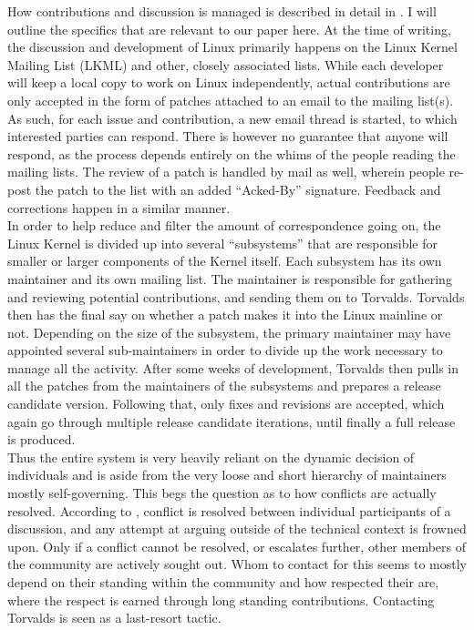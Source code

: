 How contributions and discussion is managed is described in detail in \cite{linux-participation}. I will outline the specifics that are relevant to our paper here. At the time of writing, the discussion and development of Linux primarily happens on the Linux Kernel Mailing List (LKML) and other, closely associated lists. While each developer will keep a local copy to work on Linux independently, actual contributions are only accepted in the form of patches attached to an email to the mailing list(s). As such, for each issue and contribution, a new email thread is started, to which interested parties can respond. There is however no guarantee that anyone will respond, as the process depends entirely on the whims of the people reading the mailing lists. The review of a patch is handled by mail as well, wherein people re-post the patch to the list with an added ``Acked-By'' signature. Feedback and corrections happen in a similar manner. \\

In order to help reduce and filter the amount of correspondence going on, the Linux Kernel is divided up into several ``subsystems'' that are responsible for smaller or larger components of the Kernel itself. Each subsystem has its own maintainer and its own mailing list. The maintainer is responsible for gathering and reviewing potential contributions, and sending them on to Torvalds. Torvalds then has the final say on whether a patch makes it into the Linux mainline or not. Depending on the size of the subsystem, the primary maintainer may have appointed several sub-maintainers in order to divide up the work necessary to manage all the activity. After some weeks of development, Torvalds then pulls in all the patches from the maintainers of the subsystems and prepares a release candidate version. Following that, only fixes and revisions are accepted, which again go through multiple release candidate iterations, until finally a full release is produced. \\

Thus the entire system is very heavily reliant on the dynamic decision of individuals and is aside from the very loose and short hierarchy of maintainers mostly self-governing. This begs the question as to how conflicts are actually resolved. According to \citet{linux-participation}, conflict is resolved between individual participants of a discussion, and any attempt at arguing outside of the technical context is frowned upon. Only if a conflict cannot be resolved, or escalates further, other members of the community are actively sought out. Whom to contact for this seems to mostly depend on their standing within the community and how respected their are, where the respect is earned through long standing contributions. Contacting Torvalds is seen as a last-resort tactic. \\



